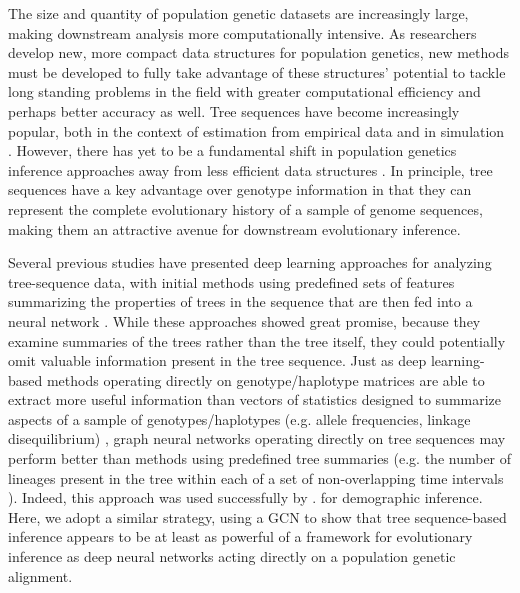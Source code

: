 The size and quantity of population genetic datasets are increasingly large, making downstream analysis more computationally intensive. As researchers develop new, more compact data structures for population genetics, new methods must be developed to fully take advantage of these structures' potential to tackle long standing problems in the field with greater computational efficiency and perhaps better accuracy as well. Tree sequences have become increasingly popular, both in the context of estimation from empirical data and in simulation \cite{hallerTreesequenceRecordingSLiM2019,kelleherEfficientPedigreeRecording2018,ralphEfficientlySummarizingRelationships2020}. However, there has yet to be a fundamental shift in population genetics inference approaches away from less efficient data structures \cite{korfmannDeepLearningPopulation2023a}. In principle, tree sequences have a key advantage over genotype information in that they can represent the complete evolutionary history of a sample of genome sequences, making them an attractive avenue for downstream evolutionary inference. 

Several previous studies have presented deep learning approaches for analyzing tree-sequence data, with initial methods using predefined sets of features summarizing the properties of trees in the sequence that are then fed into a neural network \cite{hejaseDeepLearningApproachInference2022,moDomainadaptiveNeuralNetworks2023,pearsonLocalAncestryInference2023}. While these approaches showed great promise, because they examine summaries of the trees rather than the tree itself, they could potentially omit valuable information present in the tree sequence. Just as deep learning-based methods operating directly on genotype/haplotype matrices are able to extract more useful information than vectors of statistics designed to summarize aspects of a sample of genotypes/haplotypes (e.g. allele frequencies, linkage disequilibrium) \cite{flagelUnreasonableEffectivenessConvolutional2019,kernDiploSHICUpdated2018}, graph neural networks operating directly on tree sequences may perform better than methods using predefined tree summaries (e.g. the number of lineages present in the tree within each of a set of non-overlapping time intervals \cite{hejaseDeepLearningApproachInference2022}). Indeed, this approach was used successfully by \cite{korfmannSimultaneousInferenceDemography2023}. for demographic inference. Here, we adopt a similar strategy, using a GCN to show that tree sequence-based inference appears to be at least as powerful of a framework for evolutionary inference as deep neural networks acting directly on a population genetic alignment.

